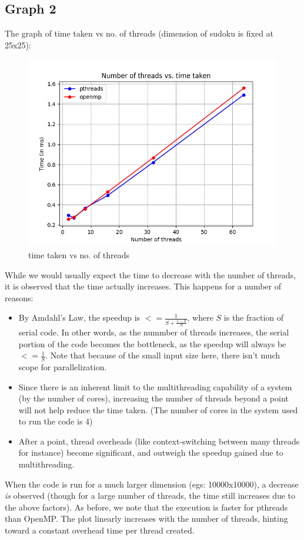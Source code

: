 \documentclass[12pt]{article}
\begin{document}
\subsection{Graph 2}
The graph of time taken vs no. of threads (dimension of sudoku is fixed at 25x25):
\begin{figure}[H]
    \centering
    \includegraphics[width=\columnwidth]{Figure_2.png}
    \caption{time taken vs no. of threads}
    \label{fig-2}
  \end{figure}

While we would usually expect the time to decrease with the number of threads, it is observed
that the time actually increases. This happens for a number of reasons:
\begin{itemize}
    \item By Amdahl's Law, the speedup is $ <= \frac{1}{S+\frac{1-S}{N}}$, where $S$ is the fraction of serial code. In other words, as the nummber of threads increases, the serial portion of the code becomes the bottleneck, as the speedup will always be $<= \frac{1}{S}$. Note that because of the 
    small input size here, there isn't much scope for parallelization. 
    \item Since there is an inherent limit to the multithreading capability of a system (by the number of cores), increasing the number of threads beyond a point will not help reduce the time taken. (The number of cores in the system used to run the code is 4)
    \item   After a point, thread overheads (like context-switching between many threads for instance) become significant, and outweigh the speedup gained due to multithreading.
\end{itemize}

When the code is run for a much larger dimension (egs: 10000x10000), a decrease \emph{is} observed (though for a large number of threads, the time still increases due to the above
factors). As before, we note that the execution is faster for pthreads than OpenMP. The plot linearly increases with the number of threads, hinting toward a constant overhead time
per thread created.
\end{document}
